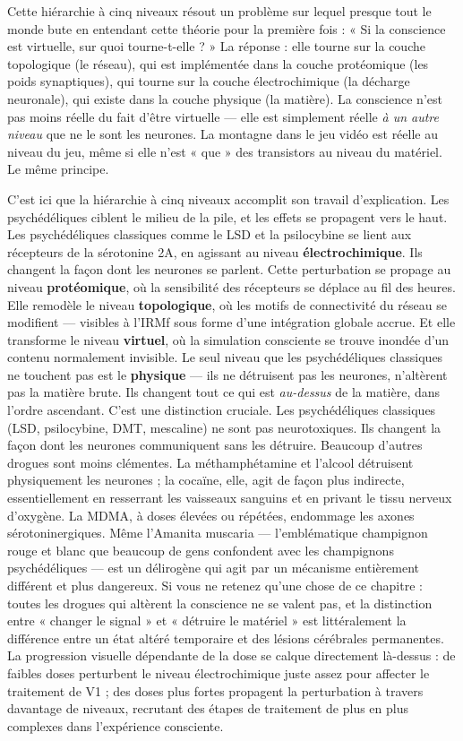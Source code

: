 \documentclass[11pt, twoside, openright]{book}
\begin{document}
Cette hiérarchie à cinq niveaux résout un problème sur lequel presque tout le monde bute en entendant cette théorie pour la première fois : « Si la conscience est virtuelle, sur quoi tourne-t-elle ? » La réponse : elle tourne sur la couche topologique (le réseau), qui est implémentée dans la couche protéomique (les poids synaptiques), qui tourne sur la couche électrochimique (la décharge neuronale), qui existe dans la couche physique (la matière). La conscience n'est pas moins réelle du fait d'être virtuelle --- elle est simplement réelle \textit{à un autre niveau} que ne le sont les neurones. La montagne dans le jeu vidéo est réelle au niveau du jeu, même si elle n'est « que » des transistors au niveau du matériel. Le même principe.

C'est ici que la hiérarchie à cinq niveaux accomplit son travail d'explication. Les psychédéliques ciblent le milieu de la pile, et les effets se propagent vers le haut. Les psychédéliques classiques comme le LSD et la psilocybine se lient aux récepteurs de la sérotonine 2A, en agissant au niveau \textbf{électrochimique}. Ils changent la façon dont les neurones se parlent. Cette perturbation se propage au niveau \textbf{protéomique}, où la sensibilité des récepteurs se déplace au fil des heures. Elle remodèle le niveau \textbf{topologique}, où les motifs de connectivité du réseau se modifient --- visibles à l'IRMf sous forme d'une intégration globale accrue. Et elle transforme le niveau \textbf{virtuel}, où la simulation consciente se trouve inondée d'un contenu normalement invisible. Le seul niveau que les psychédéliques classiques ne touchent pas est le \textbf{physique} --- ils ne détruisent pas les neurones, n'altèrent pas la matière brute. Ils changent tout ce qui est \textit{au-dessus} de la matière, dans l'ordre ascendant. C'est une distinction cruciale. Les psychédéliques classiques (LSD, psilocybine, DMT, mescaline) ne sont pas neurotoxiques. Ils changent la façon dont les neurones communiquent sans les détruire. Beaucoup d'autres drogues sont moins clémentes. La méthamphétamine et l'alcool détruisent physiquement les neurones ; la cocaïne, elle, agit de façon plus indirecte, essentiellement en resserrant les vaisseaux sanguins et en privant le tissu nerveux d'oxygène. La MDMA, à doses élevées ou répétées, endommage les axones sérotoninergiques. Même l'Amanita muscaria --- l'emblématique champignon rouge et blanc que beaucoup de gens confondent avec les champignons psychédéliques --- est un délirogène qui agit par un mécanisme entièrement différent et plus dangereux. Si vous ne retenez qu'une chose de ce chapitre : toutes les drogues qui altèrent la conscience ne se valent pas, et la distinction entre « changer le signal » et « détruire le matériel » est littéralement la différence entre un état altéré temporaire et des lésions cérébrales permanentes. La progression visuelle dépendante de la dose se calque directement là-dessus : de faibles doses perturbent le niveau électrochimique juste assez pour affecter le traitement de V1 ; des doses plus fortes propagent la perturbation à travers davantage de niveaux, recrutant des étapes de traitement de plus en plus complexes dans l'expérience consciente.
\end{document}
